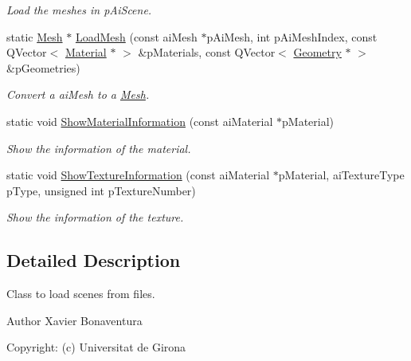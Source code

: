 \begin{DoxyCompactItemize}
\begin{DoxyCompactList}\small\item\em Load the meshes in p\+Ai\+Scene. \end{DoxyCompactList}\item 
static \hyperlink{class_mesh}{Mesh} $\ast$ \hyperlink{class_scene_loader_acee8157dee22c21533426a6faf83cd29}{Load\+Mesh} (const ai\+Mesh $\ast$p\+Ai\+Mesh, int p\+Ai\+Mesh\+Index, const Q\+Vector$<$ \hyperlink{class_material}{Material} $\ast$ $>$ \&p\+Materials, const Q\+Vector$<$ \hyperlink{class_geometry}{Geometry} $\ast$ $>$ \&p\+Geometries)
\begin{DoxyCompactList}\small\item\em Convert a ai\+Mesh to a \hyperlink{class_mesh}{Mesh}. \end{DoxyCompactList}\item 
static void \hyperlink{class_scene_loader_a5bd8ec07fe301c1b82dfe88dd65a4ece}{Show\+Material\+Information} (const ai\+Material $\ast$p\+Material)
\begin{DoxyCompactList}\small\item\em Show the information of the material. \end{DoxyCompactList}\item 
static void \hyperlink{class_scene_loader_a6095a2c3c0c5668408601312f51002c3}{Show\+Texture\+Information} (const ai\+Material $\ast$p\+Material, ai\+Texture\+Type p\+Type, unsigned int p\+Texture\+Number)
\begin{DoxyCompactList}\small\item\em Show the information of the texture. \end{DoxyCompactList}\end{DoxyCompactItemize}


\subsection{Detailed Description}
Class to load scenes from files. 

\begin{DoxyAuthor}{Author}
Xavier Bonaventura 

Copyright\+: (c) Universitat de Girona 
\end{DoxyAuthor}


